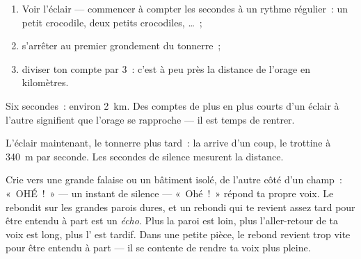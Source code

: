 \begin{method}\label{met:g4:how-sound-travels:storm}
\begin{enumerate}
  \item Voir l'éclair --- commencer à compter les secondes à un
        rythme régulier~: un petit crocodile, deux petits
        crocodiles, \dots~;
  \item s'arrêter au premier grondement du tonnerre~;
  \item diviser ton compte par $3$~: c'est à peu près la distance de
        l'orage en kilomètres.
\end{enumerate}
Six secondes~: environ \qty{2}{km}. Des comptes de plus en plus
courts d'un éclair à l'autre signifient que l'orage se rapproche ---
il est temps de rentrer.
\end{method}

\begin{omfigure}

{\small L'éclair maintenant, le tonnerre plus tard~: la 
arrive d'un coup, le  trottine à \qty{340}{m} par seconde. Les
secondes de silence mesurent la distance.}
\end{omfigure}

\begin{example}\label{ex:g4:how-sound-travels:echo}
Crie vers une grande falaise ou un bâtiment isolé, de l'autre côté
d'un champ~: «~OHÉ~!~» --- un instant de silence --- «~Ohé~!~»
répond ta propre voix. Le  rebondit sur les grandes parois dures,
et un  rebondi qui te revient assez tard pour être entendu à part
est un \emph{écho}. Plus la paroi est loin, plus
l'aller-retour de ta voix est long, plus l' est tardif. Dans une
petite pièce, le rebond revient trop vite pour être entendu à part
--- il se contente de rendre ta voix plus pleine.
\end{example}

